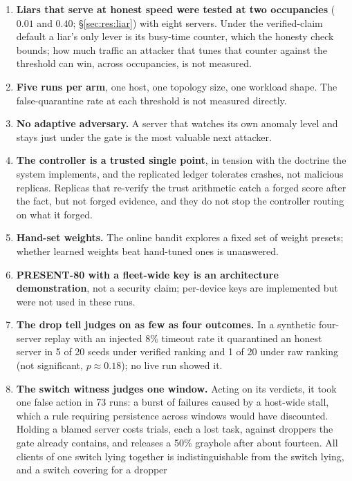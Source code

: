 \documentclass[10pt,twocolumn,letterpaper]{article}
\begin{document}
\begin{enumerate}[leftmargin=1.2em,itemsep=2pt,topsep=2pt]
\item \textbf{Liars that serve at honest speed were tested at two occupancies}
  ($0.01$ and $0.40$; \S\ref{sec:res:liar}) with eight servers. Under the
  verified-claim default a liar's only lever is its busy-time counter, which
  the honesty check bounds; how much traffic an attacker that tunes that
  counter against the threshold can win, across occupancies, is not measured.
\item \textbf{Five runs per arm}, one host, one topology size, one workload
  shape. The false-quarantine rate at each threshold is not measured directly.
\item \textbf{No adaptive adversary.} A server that watches its own anomaly
  level and stays just under the gate is the most valuable next attacker.
\item \textbf{The controller is a trusted single point}, in tension with the
  doctrine the system implements, and the replicated ledger tolerates crashes,
  not malicious replicas. Replicas that re-verify the trust arithmetic catch a
  forged score after the fact, but not forged evidence, and they do not stop
  the controller routing on what it forged.
\item \textbf{Hand-set weights.} The online bandit explores a fixed set of
  weight presets; whether learned weights beat hand-tuned ones is unanswered.
\item \textbf{PRESENT-80 with a fleet-wide key is an architecture
  demonstration}, not a security claim; per-device keys are implemented but
  were not used in these runs.
\item \textbf{The drop tell judges on as few as four outcomes.} In a synthetic
  four-server replay with an injected $8\%$ timeout rate it quarantined an
  honest server in 5 of 20 seeds under verified ranking and 1 of 20 under raw
  ranking (not significant, $p \approx 0.18$); no live run showed it.
\item \textbf{The switch witness judges one window.} Acting on its verdicts,
  it took one false action in 73 runs: a burst of failures caused by a
  host-wide stall, which a rule requiring persistence across windows would
  have discounted. Holding a blamed server costs trials, each a lost task,
  against droppers the gate already contains, and releases a 50\% grayhole
  after about fourteen. All clients of one switch lying together is
  indistinguishable from the switch lying, and a switch covering for a dropper

\end{enumerate}
\end{document}
